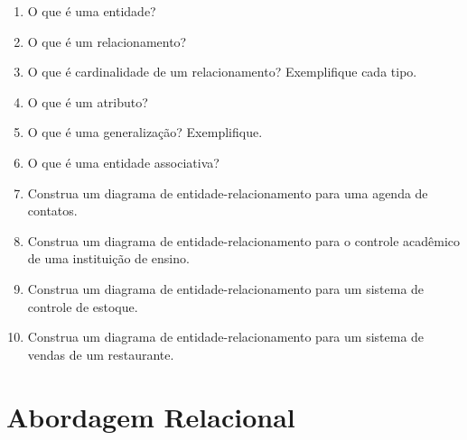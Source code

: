 \documentclass[11pt]{article}
\begin{document}
	\begin{enumerate}
		
		\item O que é uma entidade?
		
		\item O que é um relacionamento?
		
		\item O que é cardinalidade de um relacionamento? Exemplifique cada tipo.
		
		\item O que é um atributo?
		
		\item O que é uma generalização? Exemplifique.
		
		\item O que é uma entidade associativa?
		
		\item Construa um diagrama de entidade-relacionamento para uma agenda de contatos.
		
		\item Construa um diagrama de entidade-relacionamento para o controle acadêmico de uma
		instituição de ensino.
		
		\item Construa um diagrama de entidade-relacionamento para um sistema de controle de estoque.
		
		\item Construa um diagrama de entidade-relacionamento para um sistema de vendas de um
		restaurante. 
		
	\end{enumerate}
	
	\newpage
	
	\section{Abordagem Relacional}
	
\end{document}
